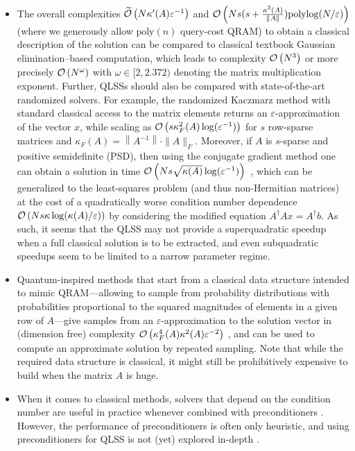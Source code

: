 \begin{refsection}
\begin{itemize}
    \item The overall complexities $\widetilde{\mathcal{O}}\left( N\kappa'(A)\varepsilon^{-1} \right)$ and $\mathcal{O}\left( Ns (s+\frac{\kappa^2(A)}{\|A\|})\text{polylog}(N/\varepsilon) \right)$ (where we generously allow $\text{poly}(n)$ query-cost QRAM) to obtain a classical description of the solution can be compared to classical textbook Gaussian elimination--based computation, which leads to complexity $\mathcal{O}\left( N^3 \right)$ or more precisely $\mathcal{O}\left( N^\omega \right)$ with $\omega\in[2,2.372)$ denoting the matrix multiplication exponent. Further, QLSSs should also be compared with state-of-the-art randomized solvers. For example, the randomized Kaczmarz method with standard classical access to the matrix elements returns an $\varepsilon$-approximation of the vector $x$, while scaling as $\mathcal{O}\left( s\kappa_F^2(A)\log(\varepsilon^{-1}) \right)$ for $s$ row-sparse matrices and $\kappa_F(A)=\left\|A^{-1}\right\|\cdot\|A\|_F$. Moreover, if $A$ is $s$-sparse and positive semidefinite (PSD), then using the conjugate gradient method one can obtain a solution in time $\mathcal{O}\left( Ns\sqrt{\kappa(A)}\log(\varepsilon^{-1}) \right)$~\cite[Chapter 10.2]{hackbusch1994IterativeSolLargeSparseLE}, which can be generalized to the least-squares problem (and thus non-Hermitian matrices) at the cost of a quadratically worse condition number dependence $\mathcal{O}\left( Ns\kappa\log(\kappa(A)/\varepsilon) \right)$ by considering the modified equation $A^\dagger A x = A^\dagger b$. As such, it seems that the QLSS may not provide a superquadratic speedup when a full classical solution is to be extracted, and even subquadratic speedups seem to be limited to a narrow parameter regime.
    
    \item Quantum-inspired methods \cite{chia2019SampdSubLinLowRankFramework,gilyen2020ImprovedQInspiredAlgorithmForRegression} that start from a classical data structure intended to mimic QRAM---allowing to sample from probability distributions with probabilities proportional to the squared magnitudes of elements in a given row of $A$---give samples from an $\varepsilon$-approximation to the solution vector in (dimension free) complexity $\mathcal{O}\left( \kappa_F^4(A)\kappa^2(A)\varepsilon^{-2} \right)$ \cite{Shao2022FQILSS,gilyen2020ImprovedQInspiredAlgorithmForRegression}, and can be used to compute an approximate solution by repeated sampling. Note that while the required data structure is classical, it might still be prohibitively expensive to build when the matrix $A$ is huge.
    
    \item When it comes to classical methods, solvers that depend on the condition number are useful in practice whenever combined with preconditioners \cite{Saad2002IterativeSLS}. However, the performance of preconditioners is often only heuristic, and using preconditioners for QLSS is not (yet) explored in-depth \cite{clader2013preconditioned,Shao2018Qpre-conditionerLSS,tong2020PrecQLinSysSolvAndMatFunEval}.
\end{itemize}


\end{refsection}
